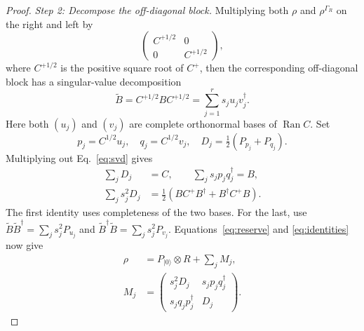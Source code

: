 \documentclass[aps,prl,reprint,superscriptaddress,longbibliography,raggedbottom]{revtex4-2}
\newcommand{\Ran}{\operatorname{Ran}}
\newcommand{\ket}[1]{\lvert #1\rangle}
\begin{document}
\begin{proof}
\emph{Step 2: Decompose the off-diagonal block.}
Multiplying both $\rho$ and $\rho^{\Gamma_R}$ on the right and left by 
\begin{equation}\label{eq:rho-composed}
\begin{pmatrix}C^{+1/2}&0\\0&C^{+1/2}\end{pmatrix}, 
\end{equation}
where $C^{+1/2}$ is the positive square root of $C^+$,
then the corresponding off-diagonal block has a singular-value decomposition
\begin{equation}\label{eq:svd}
\widetilde B=C^{+1/2}BC^{+1/2}
=\sum_{j=1}^r s_j u_jv_j^\dagger.
\end{equation}
Here  both
$(u_j)$ and $(v_j)$ are complete orthonormal bases of $\Ran C$.
Set
\begin{equation}\label{eq:components}
p_j=C^{1/2}u_j,\quad q_j=C^{1/2}v_j,\quad
D_j=\tfrac12(P_{p_j}+P_{q_j}).
\end{equation}
Multiplying out Eq.~\eqref{eq:svd} gives
\begin{align}
\sum_jD_j&=C,\qquad \sum_js_jp_jq_j^\dagger=B,\nonumber\\
\sum_js_j^2D_j&=\tfrac12(BC^+B^\dagger+B^\dagger C^+B).
\label{eq:identities}
\end{align}
The first identity uses completeness of the two bases. For the last,
use $\widetilde B\widetilde B^\dagger=\sum_js_j^2P_{u_j}$ and
$\widetilde B^\dagger\widetilde B=\sum_js_j^2P_{v_j}$.
Equations~\eqref{eq:reserve} and \eqref{eq:identities} now give
\begin{align}
\rho&=P_{\ket0}\otimes R+\sum_j M_j,\label{eq:decomposition}\\
M_j&=\begin{pmatrix}
s_j^2D_j&s_jp_jq_j^\dagger\\
s_jq_jp_j^\dagger&D_j
\end{pmatrix}.\nonumber
\end{align}



\end{proof}
\end{document}
